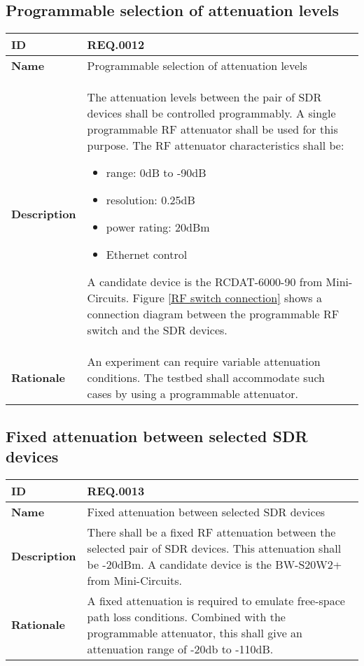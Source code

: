 \documentclass[english,titlepage,a4paper]{report}
\newcommand{\requirement}[5]{
  \subsection{#2}
  #5

  \noindent
  \begin{tabular}{|l|p{9cm}|}
    \hline
    \textbf{ID} & #1 \\
    \hline
    \textbf{Name} & #2 \\
    \hline
    \textbf{Description} & #3 \\
    \hline
    \textbf{Rationale} & #4 \\
    \hline
  \end{tabular}
}
\begin{document}
\requirement{REQ.0012}{Programmable selection of attenuation levels}{
  The attenuation levels between the pair of \acrshort{SDR} devices shall be controlled programmably.
  A single programmable \acrshort{RF} attenuator shall be used for this purpose.
  The \acrshort{RF} attenuator characteristics shall be:
  \begin{itemize}
  \item range: 0dB to -90dB
  \item resolution: 0.25dB
  \item power rating: 20dBm
  \item \gls{Ethernet} control
  \end{itemize}
  A candidate device is the \gls{RCDAT-6000-90} from Mini-Circuits.
  Figure \ref{RF switch connection} shows a connection diagram between the programmable RF switch and the SDR devices.
}{
  An \gls{experiment} can require variable attenuation conditions.
  The testbed shall accommodate such cases by using a programmable attenuator.
}{}
\requirement{REQ.0013}{Fixed attenuation between selected SDR devices}{
  There shall be a fixed \acrshort{RF} attenuation between the selected pair of \acrshort{SDR} devices.
  This attenuation shall be -20dBm.
  A candidate device is the \gls{BW-S20W2+} from Mini-Circuits.
}{
  A fixed attenuation is required to emulate free-space path loss conditions.
  Combined with the programmable attenuator, this shall give an attenuation range of -20db to -110dB.
}{}
\end{document}
